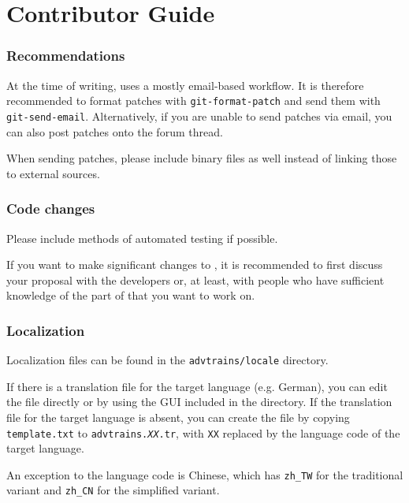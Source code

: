\part{Contributor Guide}

\section{Recommendations}
At the time of writing, \advtrains{} uses a mostly email-based workflow. It is therefore recommended to format patches with \texttt{git-format-patch} and send them with \texttt{git-send-email}. Alternatively, if you are unable to send patches via email, you can also post patches onto the forum thread.

When sending patches, please include binary files as well instead of linking those to external sources.

\section{Code changes}
Please include methods of automated testing if possible.

If you want to make significant changes to \advtrains{}, it is recommended to first discuss your proposal with the developers or, at least, with people who have sufficient knowledge of the part of \advtrains{} that you want to work on.

\section{Localization}
Localization files can be found in the \texttt{advtrains/locale} directory.

If there is a translation file for the target language (e.g. German), you can edit the file directly or by using the GUI included in the directory. If the translation file for the target language is absent, you can create the file by copying \texttt{template.txt} to \texttt{advtrains.\textit{XX}.tr}, with \texttt{XX} replaced by the language code of the target language.

An exception to the language code is Chinese, which has \texttt{zh\_TW} for the traditional variant and \texttt{zh\_CN} for the simplified variant.

